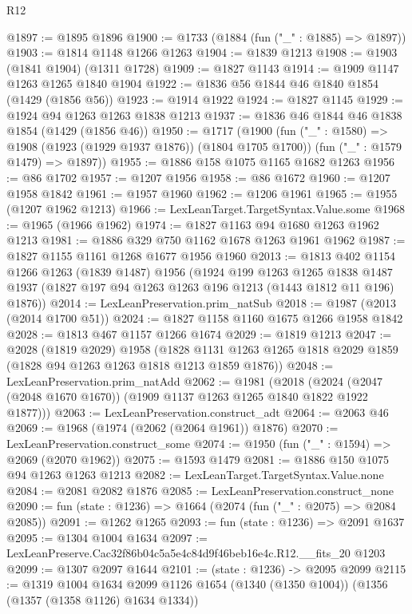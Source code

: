 \begin{lexlean}{R12}
\begin{coremodule}
@1897 := @1895 @1896
@1900 := @1733 (@1884 (fun ("_" : @1885) => @1897))
@1903 := @1814 @1148 @1266 @1263
@1904 := @1839 @1213
@1908 := @1903 (@1841 @1904) (@1311 @1728)
@1909 := @1827 @1143
@1914 := @1909 @1147 @1263 @1265 @1840 @1904
@1922 := @1836 @56 @1844 @46 @1840 @1854 (@1429 (@1856 @56))
@1923 := @1914 @1922
@1924 := @1827 @1145
@1929 := @1924 @94 @1263 @1263 @1838 @1213
@1937 := @1836 @46 @1844 @46 @1838 @1854 (@1429 (@1856 @46))
@1950 := @1717
    (@1900
      (fun ("_" : @1580) => @1908 (@1923 (@1929 @1937 @1876)) (@1804 @1705 @1700))
      (fun ("_" : @1579 @1479) => @1897))
@1955 := @1886 @158 @1075 @1165 @1682 @1263
@1956 := @86 @1702
@1957 := @1207 @1956
@1958 := @86 @1672
@1960 := @1207 @1958 @1842
@1961 := @1957 @1960
@1962 := @1206 @1961
@1965 := @1955 (@1207 @1962 @1213)
@1966 := LexLeanTarget.TargetSyntax.Value.some
@1968 := @1965 (@1966 @1962)
@1974 := @1827 @1163 @94 @1680 @1263 @1962 @1213
@1981 := @1886 @329 @750 @1162 @1678 @1263 @1961 @1962
@1987 := @1827 @1155 @1161 @1268 @1677 @1956 @1960
@2013 := @1813
    @402
    @1154
    @1266
    @1263
    (@1839 @1487)
    @1956
    (@1924
      @199
      @1263
      @1265
      @1838
      @1487
      @1937
      (@1827 @197 @94 @1263 @1263 @196 @1213 (@1443 @1812 @11 @196) @1876))
@2014 := LexLeanPreservation.prim_natSub
@2018 := @1987 (@2013 (@2014 @1700 @51))
@2024 := @1827 @1158 @1160 @1675 @1266 @1958 @1842
@2028 := @1813 @467 @1157 @1266 @1674
@2029 := @1819 @1213
@2047 := @2028
    (@1819 @2029)
    @1958
    (@1828 @1131 @1263 @1265 @1818 @2029 @1859 (@1828 @94 @1263 @1263 @1818 @1213 @1859 @1876))
@2048 := LexLeanPreservation.prim_natAdd
@2062 := @1981
    (@2018 (@2024 (@2047 (@2048 @1670 @1670)) (@1909 @1137 @1263 @1265 @1840 @1822 @1922 @1877)))
@2063 := LexLeanPreservation.construct_adt
@2064 := @2063 @46
@2069 := @1968 (@1974 (@2062 (@2064 @1961)) @1876)
@2070 := LexLeanPreservation.construct_some
@2074 := @1950 (fun ("_" : @1594) => @2069 (@2070 @1962))
@2075 := @1593 @1479
@2081 := @1886 @150 @1075 @94 @1263 @1263 @1213
@2082 := LexLeanTarget.TargetSyntax.Value.none
@2084 := @2081 @2082 @1876
@2085 := LexLeanPreservation.construct_none
@2090 := fun (state : @1236) => @1664 (@2074 (fun ("_" : @2075) => @2084 @2085))
@2091 := @1262 @1265
@2093 := fun (state : @1236) => @2091 @1637
@2095 := @1304 @1004 @1634
@2097 := LexLeanPreserve.Cac32f86b04c5a5e4c84d9f46beb16e4c.R12.__fits_20 @1203
@2099 := @1307 @2097 @1644
@2101 := (state : @1236) -> @2095 @2099
@2115 := @1319
    @1004
    @1634
    @2099
    @1126
    @1654
    (@1340 (@1350 @1004))
    (@1356 (@1357 (@1358 @1126) @1634 @1334))

\end{coremodule}
\end{lexlean}
